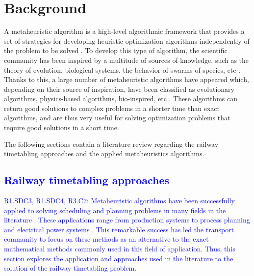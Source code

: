 \documentclass[Afour,sagev,times]{sagej}
\newcommand{\primero}[1]{\textcolor{blue}{#1}}
\begin{document}
\section{Background}
\label{sec:Background}

A metaheuristic algorithm is a high-level algorithmic framework that provides a set of strategies for developing heuristic optimization algorithms independently of the problem to be solved \cite{Sorensen13}. To develop this type of algorithm, the scientific community has been inspired by a multitude of sources of knowledge, such as the theory of evolution, biological systems, the behavior of swarms of species, etc \cite{delSer19}. Thanks to this, a large number of metaheuristic algorithms have appeared which, depending on their source of inspiration, have been classified as evolutionary algorithms, physics-based algorithms, bio-inspired, etc \cite{Talbi02, Rajwar23}. These algorithms can return good solutions to complex problems in a shorter time than exact algorithms, and are thus very useful for solving optimization problems that require good solutions in a short time.

The following sections contain a literature review regarding the railway timetabling approaches and the applied metaheuristics algorithms.

\primero{\subsection{Railway timetabling approaches}}

\primero{R1.SDC3, R1.SDC4, R3.C7: Metaheuristic algorithms have been successfully applied to solving scheduling and planning problems in many fields in the literature \cite{Zarandi20}. These applications range from production systems \cite{Neufeld23} to process planning \cite{Li15} and electrical power systems \cite{Morquecho24}. This remarkable success has led the transport community to focus on these methods as an alternative to the exact mathematical methods commonly used in this field of application. Thus, this section explores the application and approaches used in the literature to the solution of the railway timetabling problem. }
\end{document}
